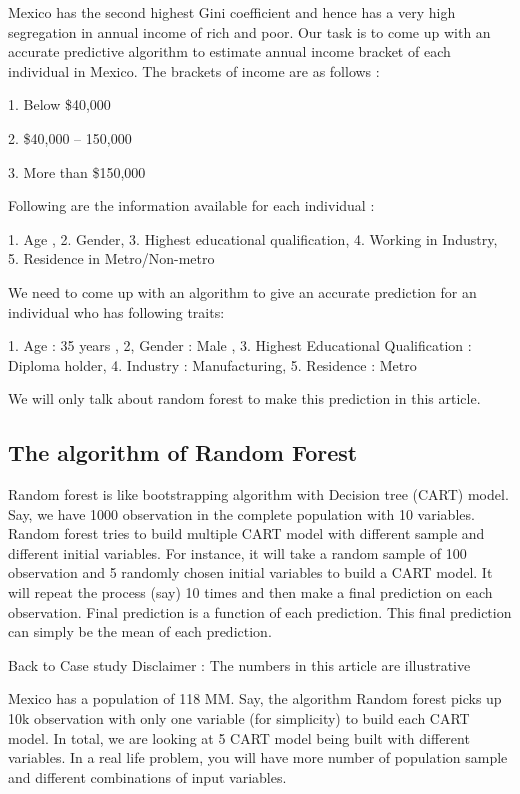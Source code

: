 \documentclass[a4paper,12pt]{article}
\begin{document}

Mexico has the second highest Gini coefficient and hence has a very high segregation in annual income of rich and poor. Our task is to come up with an accurate predictive algorithm to estimate annual income bracket of each individual in Mexico. The brackets of income are as follows :

1. Below \$40,000

2. \$40,000 – 150,000

3. More than \$150,000

Following are the information available for each individual :

1. Age , 2. Gender,  3. Highest educational qualification, 4. Working in Industry, 5. Residence in Metro/Non-metro

We need to come up with an algorithm to give an accurate prediction for an individual who has following traits:

1. Age : 35 years , 2, Gender : Male , 3. Highest Educational Qualification : Diploma holder, 4. Industry : Manufacturing, 5. Residence : Metro

We will only talk about random forest to make this prediction in this article.




\subsection*{The algorithm of Random Forest}
Random forest is like bootstrapping algorithm with Decision tree (CART) model. Say, we have 1000 observation in the complete population with 10 variables. Random forest tries to build multiple CART model with different sample and different initial variables. For instance, it will take a random sample of 100 observation and 5 randomly chosen initial variables to build a CART model. It will repeat the process (say) 10 times and then make a final prediction on each observation. Final prediction is a function of each prediction. This final prediction can simply be the mean of each prediction.



Back to Case  study
Disclaimer : The numbers in this article are illustrative

Mexico has a population of 118 MM. Say, the algorithm Random forest picks up 10k observation with only one variable (for simplicity) to build each CART model. In total, we are looking at 5 CART model being built with different variables. In a real life problem, you will have more number of population sample and different combinations of  input variables.
\end{document}
